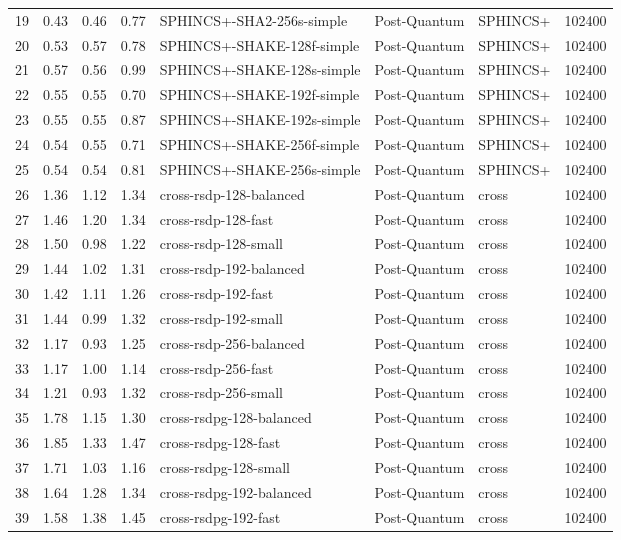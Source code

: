 \begin{table}
\begin{tabular}{lrrrlllr}
19 & 0.43 & 0.46 & 0.77 & SPHINCS+-SHA2-256s-simple & Post-Quantum & SPHINCS+ & 102400 \\
20 & 0.53 & 0.57 & 0.78 & SPHINCS+-SHAKE-128f-simple & Post-Quantum & SPHINCS+ & 102400 \\
21 & 0.57 & 0.56 & 0.99 & SPHINCS+-SHAKE-128s-simple & Post-Quantum & SPHINCS+ & 102400 \\
22 & 0.55 & 0.55 & 0.70 & SPHINCS+-SHAKE-192f-simple & Post-Quantum & SPHINCS+ & 102400 \\
23 & 0.55 & 0.55 & 0.87 & SPHINCS+-SHAKE-192s-simple & Post-Quantum & SPHINCS+ & 102400 \\
24 & 0.54 & 0.55 & 0.71 & SPHINCS+-SHAKE-256f-simple & Post-Quantum & SPHINCS+ & 102400 \\
25 & 0.54 & 0.54 & 0.81 & SPHINCS+-SHAKE-256s-simple & Post-Quantum & SPHINCS+ & 102400 \\
26 & 1.36 & 1.12 & 1.34 & cross-rsdp-128-balanced & Post-Quantum & cross & 102400 \\
27 & 1.46 & 1.20 & 1.34 & cross-rsdp-128-fast & Post-Quantum & cross & 102400 \\
28 & 1.50 & 0.98 & 1.22 & cross-rsdp-128-small & Post-Quantum & cross & 102400 \\
29 & 1.44 & 1.02 & 1.31 & cross-rsdp-192-balanced & Post-Quantum & cross & 102400 \\
30 & 1.42 & 1.11 & 1.26 & cross-rsdp-192-fast & Post-Quantum & cross & 102400 \\
31 & 1.44 & 0.99 & 1.32 & cross-rsdp-192-small & Post-Quantum & cross & 102400 \\
32 & 1.17 & 0.93 & 1.25 & cross-rsdp-256-balanced & Post-Quantum & cross & 102400 \\
33 & 1.17 & 1.00 & 1.14 & cross-rsdp-256-fast & Post-Quantum & cross & 102400 \\
34 & 1.21 & 0.93 & 1.32 & cross-rsdp-256-small & Post-Quantum & cross & 102400 \\
35 & 1.78 & 1.15 & 1.30 & cross-rsdpg-128-balanced & Post-Quantum & cross & 102400 \\
36 & 1.85 & 1.33 & 1.47 & cross-rsdpg-128-fast & Post-Quantum & cross & 102400 \\
37 & 1.71 & 1.03 & 1.16 & cross-rsdpg-128-small & Post-Quantum & cross & 102400 \\
38 & 1.64 & 1.28 & 1.34 & cross-rsdpg-192-balanced & Post-Quantum & cross & 102400 \\
39 & 1.58 & 1.38 & 1.45 & cross-rsdpg-192-fast & Post-Quantum & cross & 102400 \\

\end{tabular}
\end{table}
